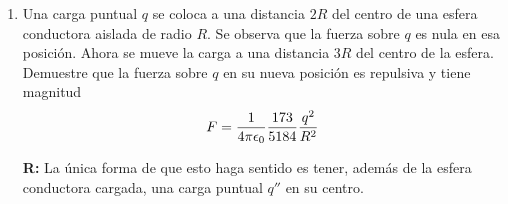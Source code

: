 \documentclass[]{article}
\numberwithin{equation}{section}
\newcommand{\0}{\textcolor{gray}{0}}
\newcommand{\rv}{\mathbf{r}}
\newcommand{\rdif}{\rv - \rv'}
\newcommand{\td}[2]{\dfrac{d #1}{d #2}}
\begin{document}
\begin{enumerate}
	\textbf{R:}
	\begin{align*}
		\left[z - \mathcal{L}(\rv)\right] G(\rv,\rv'; z) &= -4 \pi \delta(\rdif)\\
		z G(x, x'; z) + \td{^2}{x^2} G(x,x'; z) &= -4 \pi \delta(x - x')\\
		\Rightarrow G(x,x'; z) &= 2 \sum_{n=1}^{\infty} \frac{\sin(n\pi x) \sin(n\pi x')}{z - (n\pi)^2}
	\end{align*}
	
	\item Una carga puntual \(q\) se coloca a una distancia \(2R\) del centro de una esfera conductora aislada de radio \(R\). Se observa que la fuerza sobre \(q\) es nula en esa posición. Ahora se mueve la carga a una distancia \(3R\) del centro de la esfera. Demuestre que la fuerza sobre \(q\) en su nueva posición es repulsiva y tiene magnitud
	\begin{equation*}
		F = \ke \frac{173}{5184} \frac{q^2}{R^2}
	\end{equation*}
	
	\textbf{R:} La única forma de que esto haga sentido es tener, además de la esfera conductora cargada, una carga puntual \(q''\) en su centro.
	

\end{enumerate}
\end{document}
